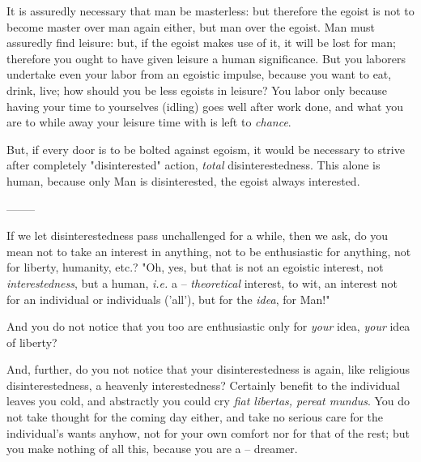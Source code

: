 It is assuredly necessary that man be masterless: but therefore the egoist is 
not to become master over man again either, but man over the egoist. Man must 
assuredly find leisure: but, if the egoist makes use of it, it will be lost 
for man; therefore you ought to have given leisure a human significance. But 
you laborers undertake even your labor from an egoistic impulse, because you 
want to eat, drink, live; how should you be less egoists in leisure? You labor 
only because having your time to yourselves (idling) goes well after work 
done, and what you are to while away your leisure time with is left to 
\textit{chance}.

But, if every door is to be bolted against egoism, it would be necessary to 
strive after completely "{}disinterested"{} action, \textit{total} 
disinterestedness. This alone is human, because only Man is disinterested, the 
egoist always interested.

\begin{center}
--------\end{center}


If we let disinterestedness pass unchallenged for a while, then we ask, do you 
mean not to take an interest in anything, not to be enthusiastic for anything, 
not for liberty, humanity, etc.? "{}Oh, yes, but that is not an egoistic 
interest, not \textit{interestedness}, but a human, \textit{i.e.} a -- 
\textit{theoretical} interest, to wit, an interest not for an individual or 
individuals ('all'), but for the \textit{idea}, for Man!"{}

And you do not notice that you too are enthusiastic only for \textit{your} 
idea, \textit{your} idea of liberty?

And, further, do you not notice that your disinterestedness is again, like 
religious disinterestedness, a heavenly interestedness? Certainly benefit to 
the individual leaves you cold, and abstractly you could cry \textit{fiat 
libertas, pereat mundus}. You do not take thought for the coming day either, 
and take no serious care for the individual's wants anyhow, not for your own 
comfort nor for that of the rest; but you make nothing of all this, because 
you are a -- dreamer.

